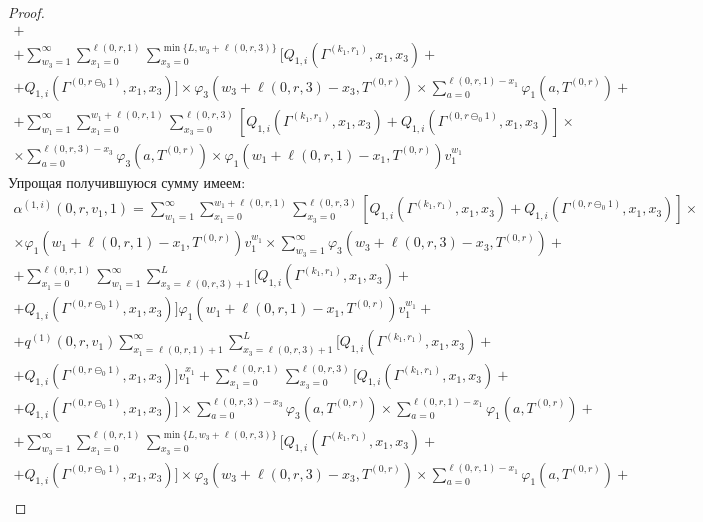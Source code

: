\documentclass[a4paper,12pt,russian]{extarticle}
\begin{document}
\begin{proof}
\begin{multline*}
+ \\ +
    \sum_{w_3=1}^{\infty} \sum_{x_1=0}^{\ell(0,r,1)} \sum_{x_3=0}^{\min{\{L, w_3 + \ell(0,r,3)\}}} [  Q_{1,i}(\Gamma^{(k_1, r_1)},x_1, x_3) +\\
    +Q_{1,i}(\Gamma^{(0, r\ominus_0 1)},x_1, x_3)] \times \varphi_3(w_3 + \ell(0,r,3) - x_3,T^{(0,r)})  \times \sum_{a=0}^{\ell(0,r,1)-x_1}\varphi_1(a,T^{(0,r)})   + \\
    +
     \sum_{w_1=1}^{\infty} \sum_{x_1=0}^{w_1 + \ell(0,r,1) } \sum_{x_3=0}^{\ell(0,r,3)} [  Q_{1,i}(\Gamma^{(k_1, r_1)},x_1, x_3) 
    +Q_{1,i}(\Gamma^{(0, r\ominus_0 1)},x_1, x_3)]\times  \\ \times \sum_{a=0}^{\ell(0,r,3)-x_3}\varphi_3(a,T^{(0,r)}) \times \varphi_1(w_1 + \ell(0,r,1) - x_1,T^{(0,r)}) v_1^{w_1}
\end{multline*}
Упрощая получившуюся сумму имеем:
\begin{multline*}
    \alpha^{(1,i)}(0,r,v_1,1) = 
   \sum_{w_1=1}^{\infty} \sum_{x_1=0}^{w_1+\ell(0,r,1)}  \sum_{x_3=0}^{\ell(0,r,3)}  [  Q_{1,i}(\Gamma^{(k_1, r_1)},x_1, x_3)
    +Q_{1,i}(\Gamma^{(0, r\ominus_0 1)},x_1, x_3)] \times  \\
   \times \varphi_1(w_1 + \ell(0,r,1) - x_1,T^{(0,r)})  v_1^{w_1} \times \sum_{w_3=1}^{\infty}\varphi_3(w_3 + \ell(0,r,3) - x_3,T^{(0,r)})  + \\
    +  \sum_{x_1=0}^{\ell(0,r,1)} \sum_{w_1=1}^{\infty}   \sum_{x_3=\ell(0,r,3)+1}^{L} [  Q_{1,i}(\Gamma^{(k_1, r_1)},x_1, x_3) + \\
    +Q_{1,i}(\Gamma^{(0, r\ominus_0 1)},x_1, x_3)] \varphi_1(w_1 + \ell(0,r,1) - x_1,T^{(0,r)})v_1^{w_1} +  \\
    +q^{(1)}(0,r,v_1)\sum_{x_1=\ell(0,r,1)+1}^{\infty}   \sum_{x_3=\ell(0,r,3)+1}^{L}   [  Q_{1,i}(\Gamma^{(k_1, r_1)},x_1, x_3) +\\
    +Q_{1,i}(\Gamma^{(0, r\ominus_0 1)},x_1, x_3)] v_1^{x_1}  
    +  \sum_{x_1=0}^{\ell(0,r,1)} \sum_{x_3=0}^{\ell(0,r,3)} [  Q_{1,i}(\Gamma^{(k_1, r_1)},x_1, x_3) +\\
    +Q_{1,i}(\Gamma^{(0, r\ominus_0 1)},x_1, x_3)]\times
\sum_{a=0}^{\ell(0,r,3)-x_3}\varphi_3(a,T^{(0,r)}) \times \sum_{a=0}^{\ell(0,r,1)-x_1}\varphi_1(a,T^{(0,r)})
+ \\ +
    \sum_{w_3=1}^{\infty} \sum_{x_1=0}^{\ell(0,r,1)} \sum_{x_3=0}^{\min{\{L, w_3 + \ell(0,r,3)\}}} [  Q_{1,i}(\Gamma^{(k_1, r_1)},x_1, x_3) +\\
    +Q_{1,i}(\Gamma^{(0, r\ominus_0 1)},x_1, x_3)] \times \varphi_3(w_3 + \ell(0,r,3) - x_3,T^{(0,r)})  \times \sum_{a=0}^{\ell(0,r,1)-x_1}\varphi_1(a,T^{(0,r)})   + \\

\end{multline*}
\end{proof}
\end{document}
